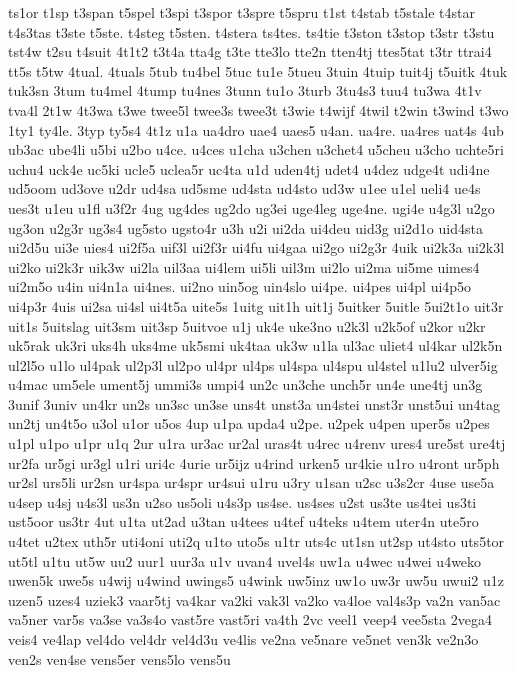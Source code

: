 {ts1or
t1sp
t3span
t5spel
t3spi
t3spor
t3spre
t5spru
t1st
t4stab
t5stale
t4star
t4s3tas
t3ste
t5ste.
t4steg
t5sten.
t4stera
ts4tes.
ts4tie
t3ston
t3stop
t3str
t3stu
tst4w
t2su
t4suit
4t1t2
t3t4a
tta4g
t3te
tte3lo
tte2n
tten4tj
ttes5tat
t3tr
ttrai4
tt5s
t5tw
4tual.
4tuals
5tub
tu4bel
5tuc
tu1e
5tueu
3tuin
4tuip
tuit4j
t5uitk
4tuk
tuk3sn
3tum
tu4mel
4tump
tu4nes
3tunn
tu1o
3turb
3tu4s3
tuu4
tu3wa
4t1v
tva4l
2t1w
4t3wa
t3we
twee5l
twee3s
twee3t
t3wie
t4wijf
4twil
t2win
t3wind
t3wo
1ty1
ty4le.
3typ
ty5s4
4t1z
u1a
ua4dro
uae4
uaes5
u4an.
ua4re.
ua4res
uat4s
4ub
ub3ac
ube4li
u5bi
u2bo
u4ce.
u4ces
u1cha
u3chen
u3chet4
u5cheu
u3cho
uchte5ri
uchu4
uck4e
uc5ki
ucle5
uclea5r
uc4ta
u1d
uden4tj
udet4
u4dez
udge4t
udi4ne
ud5oom
ud3ove
u2dr
ud4sa
ud5sme
ud4sta
ud4sto
ud3w
u1ee
u1el
ueli4
ue4s
ues3t
u1eu
u1fl
u3f2r
4ug
ug4des
ug2do
ug3ei
uge4leg
uge4ne.
ugi4e
u4g3l
u2go
ug3on
u2g3r
ug3s4
ug5sto
ugsto4r
u3h
u2i
ui2da
ui4deu
uid3g
ui2d1o
uid4sta
ui2d5u
ui3e
uies4
ui2f5a
uif3l
ui2f3r
ui4fu
ui4gaa
ui2go
ui2g3r
4uik
ui2k3a
ui2k3l
ui2ko
ui2k3r
uik3w
ui2la
uil3aa
ui4lem
ui5li
uil3m
ui2lo
ui2ma
ui5me
uimes4
ui2m5o
u4in
ui4n1a
ui4nes.
ui2no
uin5og
uin4slo
ui4pe.
ui4pes
ui4pl
ui4p5o
ui4p3r
4uis
ui2sa
ui4sl
ui4t5a
uite5s
1uitg
uit1h
uit1j
5uitker
5uitle
5ui2t1o
uit3r
uit1s
5uitslag
uit3sm
uit3sp
5uitvoe
u1j
uk4e
uke3no
u2k3l
u2k5of
u2kor
u2kr
uk5rak
uk3ri
uks4h
uks4me
uk5smi
uk4taa
uk3w
u1la
ul3ac
uliet4
ul4kar
ul2k5n
ul2l5o
u1lo
ul4pak
ul2p3l
ul2po
ul4pr
ul4ps
ul4spa
ul4spu
ul4stel
u1lu2
ulver5ig
u4mac
um5ele
ument5j
ummi3s
umpi4
un2c
un3che
unch5r
un4e
une4tj
un3g
3unif
3univ
un4kr
un2s
un3sc
un3se
uns4t
unst3a
un4stei
unst3r
unst5ui
un4tag
un2tj
un4t5o
u3ol
u1or
u5os
4up
u1pa
upda4
u2pe.
u2pek
u4pen
uper5s
u2pes
u1pl
u1po
u1pr
u1q
2ur
u1ra
ur3ac
ur2al
uras4t
u4rec
u4renv
ures4
ure5st
ure4tj
ur2fa
ur5gi
ur3gl
u1ri
uri4c
4urie
ur5ijz
u4rind
urken5
ur4kie
u1ro
u4ront
ur5ph
ur2sl
urs5li
ur2sn
ur4spa
ur4spr
ur4sui
u1ru
u3ry
u1san
u2sc
u3s2cr
4use
use5a
u4sep
u4sj
u4s3l
us3n
u2so
us5oli
u4s3p
us4se.
us4ses
u2st
us3te
us4tei
us3ti
ust5oor
us3tr
4ut
u1ta
ut2ad
u3tan
u4tees
u4tef
u4teks
u4tem
uter4n
ute5ro
u4tet
u2tex
uth5r
uti4oni
uti2q
u1to
uto5s
u1tr
uts4c
ut1sn
ut2sp
ut4sto
uts5tor
ut5tl
u1tu
ut5w
uu2
uur1
uur3a
u1v
uvan4
uvel4s
uw1a
u4wec
u4wei
u4weko
uwen5k
uwe5s
u4wij
u4wind
uwings5
u4wink
uw5inz
uw1o
uw3r
uw5u
uwui2
u1z
uzen5
uzes4
uziek3
vaar5tj
va4kar
va2ki
vak3l
va2ko
va4loe
val4s3p
va2n
van5ac
va5ner
var5s
va3se
va3s4o
vast5re
vast5ri
va4th
2vc
veel1
veep4
vee5sta
2vega4
veis4
ve4lap
vel4do
vel4dr
vel4d3u
ve4lis
ve2na
ve5nare
ve5net
ven3k
ve2n3o
ven2s
ven4se
vens5er
vens5lo
vens5u
}
